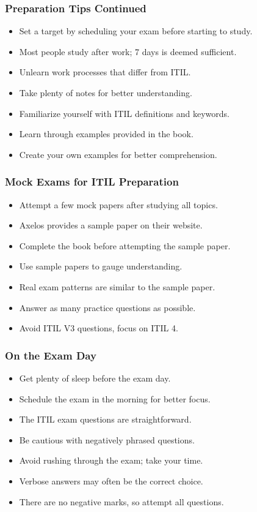 \documentclass[aspectratio=169, table]{beamer}
\begin{document}
\begin{frame}
	\frametitle{Preparation Tips Continued}
	\begin{itemize}
		\item Set a target by scheduling your exam before starting to study.
		\item Most people study after work; 7 days is deemed sufficient.
		\item Unlearn work processes that differ from ITIL.
		\item Take plenty of notes for better understanding.
		\item Familiarize yourself with ITIL definitions and keywords.
		\item Learn through examples provided in the book.
		\item Create your own examples for better comprehension.
	\end{itemize}
\end{frame}

\begin{frame}
	\frametitle{Mock Exams for ITIL Preparation}
	\begin{itemize}
		\item Attempt a few mock papers after studying all topics.
		\item Axelos provides a sample paper on their website.
		\item Complete the book before attempting the sample paper.
		\item Use sample papers to gauge understanding.
		\item Real exam patterns are similar to the sample paper.
		\item Answer as many practice questions as possible.
		\item Avoid ITIL V3 questions, focus on ITIL 4.
	\end{itemize}
\end{frame}

\begin{frame}
	\frametitle{On the Exam Day}
	\begin{itemize}
		\item Get plenty of sleep before the exam day.
		\item Schedule the exam in the morning for better focus.
		\item The ITIL exam questions are straightforward.
		\item Be cautious with negatively phrased questions.
		\item Avoid rushing through the exam; take your time.
		\item Verbose answers may often be the correct choice.
		\item There are no negative marks, so attempt all questions.
	\end{itemize}
\end{frame}
\end{document}
